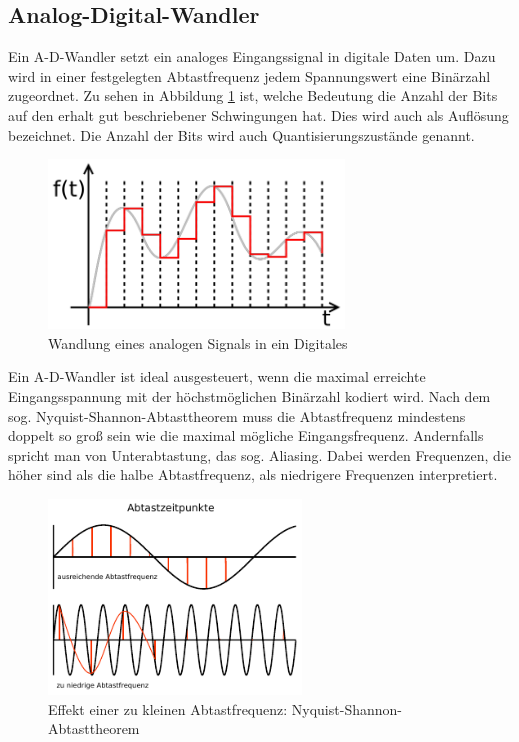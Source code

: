 \subsection{Analog-Digital-Wandler}

Ein A-D-Wandler setzt ein analoges Eingangssignal in digitale Daten um. Dazu wird in einer festgelegten Abtastfrequenz jedem Spannungswert eine Binärzahl zugeordnet.
Zu sehen in Abbildung \ref{adw} ist, welche Bedeutung die Anzahl der Bits auf den erhalt gut beschriebener Schwingungen hat. Dies wird auch als Auflösung bezeichnet. Die Anzahl der Bits wird auch Quantisierungszustände genannt.
\begin{figure}[H]
     \centering     
     \includegraphics[width=0.7\textwidth]{Abb/adw.pdf}
     \caption{Wandlung eines analogen Signals in ein Digitales}
     \label{adw}
\end{figure}
Ein A-D-Wandler ist ideal ausgesteuert, wenn die maximal erreichte Eingangsspannung mit der höchstmöglichen Binärzahl kodiert wird. 
Nach dem sog. Nyquist-Shannon-Abtasttheorem muss die Abtastfrequenz mindestens doppelt so groß sein wie die maximal mögliche Eingangsfrequenz. Andernfalls spricht man von Unterabtastung, das sog. Aliasing. Dabei werden Frequenzen, die höher sind als die halbe Abtastfrequenz, als niedrigere Frequenzen interpretiert.
\begin{figure}[H]
    \centering
    \includegraphics[width=0.6\textwidth]{Abb/abtast.pdf} 
    \caption{Effekt einer zu kleinen Abtastfrequenz: Nyquist-Shannon-Abtasttheorem}
\end{figure}


